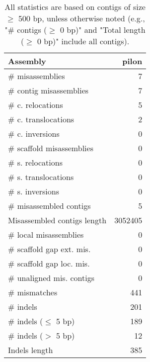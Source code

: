 \documentclass[12pt,a4paper]{article}
\begin{document}
\begin{table}[ht]
\begin{center}
\caption{All statistics are based on contigs of size $\geq$ 500 bp, unless otherwise noted (e.g., "\# contigs ($\geq$ 0 bp)" and "Total length ($\geq$ 0 bp)" include all contigs).}
\begin{tabular}{|l*{1}{|r}|}
\hline
Assembly & pilon \\ \hline
\# misassemblies & 7 \\ \hline
\hspace{2mm}\# contig misassemblies & 7 \\ \hline
\hspace{5mm}\# c. relocations & 5 \\ \hline
\hspace{5mm}\# c. translocations & 2 \\ \hline
\hspace{5mm}\# c. inversions & 0 \\ \hline
\hspace{2mm}\# scaffold misassemblies & 0 \\ \hline
\hspace{5mm}\# s. relocations & 0 \\ \hline
\hspace{5mm}\# s. translocations & 0 \\ \hline
\hspace{5mm}\# s. inversions & 0 \\ \hline
\# misassembled contigs & 5 \\ \hline
Misassembled contigs length & 3052405 \\ \hline
\# local misassemblies & 0 \\ \hline
\# scaffold gap ext. mis. & 0 \\ \hline
\# scaffold gap loc. mis. & 0 \\ \hline
\# unaligned mis. contigs & 0 \\ \hline
\# mismatches & 441 \\ \hline
\# indels & 201 \\ \hline
\hspace{5mm}\# indels ($\leq$ 5 bp) & 189 \\ \hline
\hspace{5mm}\# indels ($>$ 5 bp) & 12 \\ \hline
Indels length & 385 \\ \hline
\end{tabular}
\end{center}
\end{table}
\end{document}
